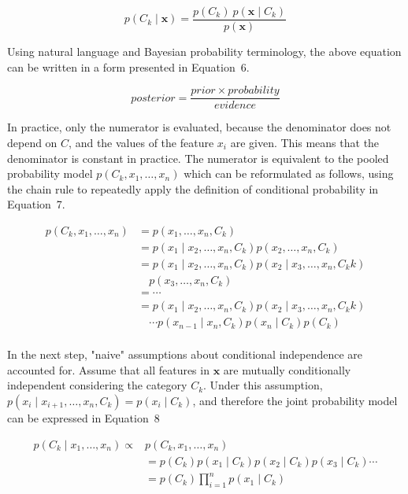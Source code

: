 \documentclass[preprint,12pt]{elsarticle}
\begin{document}
\begin{equation}
	p(C_{k}\mid \mathbf{x})={\frac{p(C_{k})\ p(\mathbf{x} \mid C_{k})}{p(\mathbf{x})}}
	\label{eqn:5}
\end{equation}

Using natural language and Bayesian probability terminology, the above equation can be written in a form presented in Equation~6.

\begin{equation}
	posterior = \frac{prior \times probability}{evidence}
	\label{eqn:6}
\end{equation}

In practice, only the numerator is evaluated, because the denominator does not depend on $C$, and the values of the feature $x_{i}$ are given. This means that the denominator is constant in practice. The numerator is equivalent to the pooled probability model $p(C_{k},x_{1},\ldots,x_{n})$ which can be reformulated as follows, using the chain rule to repeatedly apply the definition of conditional probability in Equation~7.

\begin{equation}
	\begin{aligned}
        p(C_{k},x_{1},\ldots,x_{n}) &= p(x_{1},\ldots,x_{n},C_{k}) \\
        &= p(x_{1}\mid x_{2}, \ldots,x_{n},C_{k}) p(x_{2},\ldots,x_{n},C_{k}) \\
        &= p(x_{1}\mid x_{2}, \ldots,x_{n},C_{k}) p(x_{2}\mid x_{3}, \ldots,x_{n},C_{k} {k}) \\
        &\quad p(x_{3},\ldots,x_{n},C_{k}) \\
        &= \cdots \\
        &= p(x_{1}\mid x_{2}, \ldots,x_{n},C_{k}) p(x_{2}\mid x_{3}, \ldots,x_{n},C_{k} {k}) \\
        &\quad \cdots p(x_{n-1}\mid x_{n},C_{k}) p(x_{n}\mid C_{k}) p(C_{k})\\
    \end{aligned}
	\label{eqn:7}
\end{equation}

In the next step, "naive" assumptions about conditional independence are accounted for. Assume that all features in $\mathbf{x}$ are mutually conditionally independent considering the category $C_{k}$. Under this assumption, $p(x_{i}\mid x_{i+1}, \ldots,x_{n},C_{k}) = p(x_{i}\mid C_{k})$, and therefore the joint probability model can be expressed in Equation~8

\begin{equation}
	\begin{aligned}
        p(C_{k}\mid x_{1},\ldots,x_{n}) \propto &p(C_{k}, x_{1},\ldots,x_{n}) \\
        &= p(C_{k})p(x_{1}\mid C_{k}) p(x_{2}\mid C_{k}) p(x_{3}\mid C_{k}) \cdots \\
        &= p(C_{k}) \prod_{i=1}^{n} p(x_{1}\mid C_{k}) \\
    \end{aligned}
	\label{eqn:8}
\end{equation}
\end{document}
